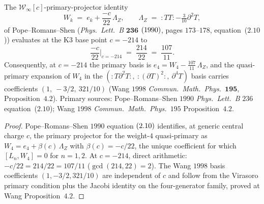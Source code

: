 \begin{proposition}[Pope--Romans--Shen projector coefficient at
$c=-214$; \ClaimStatusProvedElsewhere]
\label{prop:canonical-prs-coefficient-cm214}
The $\mathcal W_\infty[c]$-primary-projector identity
\[
 W_k \;=\; e_k + \frac{-c}{22}\, \Lambda_Z,
 \qquad \Lambda_Z \;=\; {:}TT{:} - \tfrac{3}{10}\partial^2 T,
\]
of Pope--Romans--Shen \textup{(}\emph{Phys.~Lett.~B} $\mathbf{236}$ $\textup{(}1990\textup{)}$,
pages $173$--$178$, equation~\textup{(}$2.10$\textup{)}\textup{)} evaluates at the K3 base
point $c=-214$ to
\[
 \frac{-c}{22}\bigg|_{c=-214} \;=\; \frac{214}{22} \;=\; \frac{107}{11}.
\]
Consequently, at $c=-214$ the primary basis is
$e_4 = W_4 - \tfrac{107}{11}\,\Lambda_Z$, and the quasi-primary
expansion of $W_4$ in the $(:T\partial^2 T:,\ :(\partial T)^2:,\
\partial^4 T)$ basis carries coefficients $(1,\ -3/2,\ 321/10)$
\textup{(}Wang $1998$ \emph{Commun.~Math.~Phys.~}$\mathbf{195}$, Proposition~$4.2$\textup{)}.
Primary sources: Pope--Romans--Shen $1990$ \emph{Phys.~Lett.~B} $236$
equation~\textup{(}$2.10$\textup{)}; Wang $1998$ \emph{Commun.~Math.~Phys.~}$195$
Proposition~$4.2$.
\end{proposition}

\begin{proof}
Pope--Romans--Shen $1990$ equation $\textup{(}2.10\textup{)}$ identifies, at generic
central charge $c$, the primary projector for the weight-$4$
quasi-primary as $W_4 = e_4 + \beta(c)\,\Lambda_Z$ with
$\beta(c) = -c/22$, the unique coefficient for which
$[L_n, W_4] = 0$ for $n=1,2$. At $c=-214$, direct arithmetic:
$-c/22 = 214/22 = 107/11$ \textup{(}$\gcd(214,22)=2$\textup{)}.
The Wang $1998$ basis coefficients $(1, -3/2, 321/10)$ are
independent of $c$ and follow from the Virasoro primary condition
plus the Jacobi identity on the four-generator family, proved
at Wang Proposition~$4.2$.
\end{proof}

